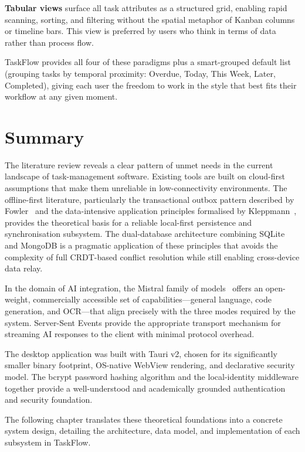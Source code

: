 \textbf{Tabular views} surface all task attributes as a structured grid, enabling rapid
scanning, sorting, and filtering without the spatial metaphor of Kanban columns or
timeline bars.
This view is preferred by users who think in terms of data rather than process flow.

TaskFlow provides all four of these paradigms plus a smart-grouped default list
(grouping tasks by temporal proximity: Overdue, Today, This Week, Later, Completed),
giving each user the freedom to work in the style that best fits their workflow at any
given moment.

\section{Summary}\label{sec:bg_summary}

The literature review reveals a clear pattern of unmet needs in the current landscape of
task-management software.
Existing tools are built on cloud-first assumptions that make them unreliable in
low-connectivity environments.
The offline-first literature, particularly the transactional outbox pattern described
by Fowler~\cite{fowler2002patterns} and the data-intensive application principles
formalised by Kleppmann~\cite{kleppmann2017designing}, provides the theoretical basis
for a reliable local-first persistence and synchronisation subsystem.
The dual-database architecture combining SQLite and MongoDB is a pragmatic application
of these principles that avoids the complexity of full CRDT-based conflict resolution
while still enabling cross-device data relay.

In the domain of AI integration, the Mistral family of models~\cite{jiang2023mistral}
offers an open-weight, commercially accessible set of capabilities---general language,
code generation, and OCR---that align precisely with the three modes required by the
system.
Server-Sent Events provide the appropriate transport mechanism for streaming AI
responses to the client with minimal protocol overhead.

The desktop application was built with Tauri v2, chosen for its
significantly smaller binary footprint, OS-native WebView rendering,
and declarative security model.
The bcrypt password hashing algorithm and the local-identity middleware
together provide a well-understood and academically grounded
authentication and security foundation.

The following chapter translates these theoretical foundations into a concrete system
design, detailing the architecture, data model, and implementation of each subsystem
in TaskFlow.
